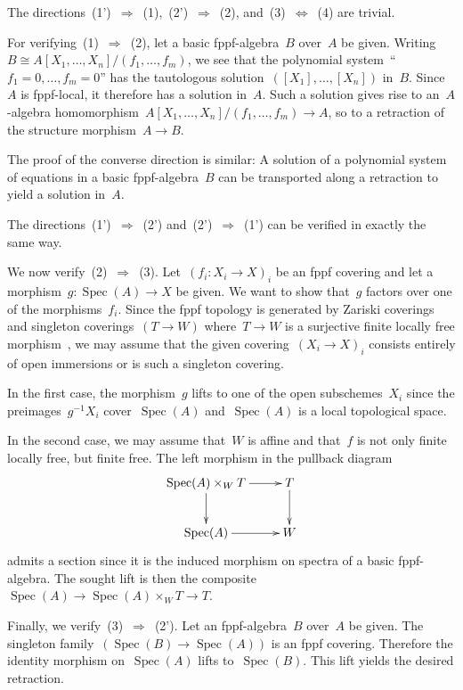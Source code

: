 \documentclass[10pt,reqno,a4paper]{amsbook}
\makeatletter
\theoremstyle{definition}
\theoremstyle{plain}
\theoremstyle{remark}
\DeclareMathOperator{\Spec}{Spec}
\newcommand{\?}{\,{:}\,}
\renewcommand{\_}{\mathpunct{.}\,}
\newcommand{\stacksproject}[1]{\cite[{\href{https://stacks.math.columbia.edu/tag/#1}{Tag~#1}}]{stacks-project}}
\renewenvironment{proof}[1][\proofname]{\par
  \pushQED{\qed}%
  \normalfont \topsep6\p@\@plus6\p@\relax
  \trivlist
  \item[\hskip\labelsep
        \itshape
    #1\@addpunct{.}]\ignorespaces
}{%
  \popQED\endtrivlist\@endpefalse
}
\makeatother
\begin{document}
\begin{proof}The directions~(1')~$\Rightarrow$~(1),~(2')~$\Rightarrow$~(2),
and~(3)~$\Leftrightarrow$~(4) are trivial.

For verifying~(1)~$\Rightarrow$~(2), let a basic fppf-algebra~$B$ over~$A$ be
given. Writing~$B \cong A[X_1,\ldots,X_n]/(f_1,\ldots,f_m)$, we see that the
polynomial system~``$f_1 = 0, \ldots, f_m = 0$'' has the tautologous
solution~$([X_1],\ldots,[X_n])$ in~$B$. Since~$A$ is fppf-local, it therefore
has a solution in~$A$. Such a solution gives rise to an~$A$-algebra
homomorphism~$A[X_1,\ldots,X_n]/(f_1,\ldots,f_m) \to A$, so to a retraction of
the structure morphism~$A \to B$.

The proof of the converse direction is similar: A solution of a polynomial
system of equations in a basic fppf-algebra~$B$ can be transported along a
retraction to yield a solution in~$A$.

The directions~(1')~$\Rightarrow$~(2') and~(2')~$\Rightarrow$~(1') can be
verified in exactly the same way.

We now verify~(2)~$\Rightarrow$~(3). Let~$(f_i : X_i \to X)_i$ be an fppf
covering and let a morphism~$g : \Spec(A) \to X$ be given. We want to show
that~$g$ factors over one of the morphisms~$f_i$. Since the fppf topology is
generated by Zariski coverings and singleton coverings~$(T \to W)$ where~$T \to
W$ is a surjective finite locally free morphism~\stacksproject{05WN}, we may
assume that the given covering~$(X_i \to X)_i$ consists entirely of open
immersions or is such a singleton covering.

In the first case, the morphism~$g$ lifts to one of the open subschemes~$X_i$
since the preimages~$g^{-1}X_i$ cover~$\Spec(A)$ and~$\Spec(A)$ is a local
topological space.

In the second case, we may assume that~$W$ is affine and that~$f$ is not only
finite locally free, but finite free. The left morphism in the pullback diagram
\[ \xymatrix{
  \Spec(A) \times_W T \ar[r]\ar[d] & T \ar[d] \\
  \Spec(A) \ar[r] & W
} \]
admits a section since it is the induced morphism on spectra of a basic
fppf-algebra. The sought lift is then the composite~$\Spec(A) \to \Spec(A)
\times_W T \to T$.

Finally, we verify~(3)~$\Rightarrow$~(2'). Let an fppf-algebra~$B$ over~$A$ be
given. The singleton family~$(\Spec(B) \to \Spec(A))$ is an fppf covering.
Therefore the identity morphism on~$\Spec(A)$ lifts to~$\Spec(B)$. This lift
yields the desired retraction.
\end{proof}
\end{document}
